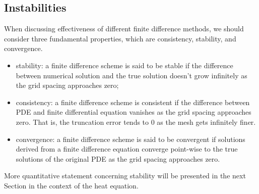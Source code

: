 
\subsection{Instabilities}
When discussing effectiveness of different finite difference methods, we should consider three fundamental properties, which are consistency, stability, and convergence. %

\begin{itemize}
\item stability: a finite difference scheme is said to be stable if the difference between numerical solution and the true solution doesn't grow infinitely as the grid spacing approaches zero; %
\item consistency: a finite difference scheme is consistent if the difference between PDE and finite differential equation vanishes as the grid spacing approaches zero. That is, the truncation error tends to 0 as the mesh gets infinitely finer.
\item convergence: a finite difference scheme is said to be convergent if solutions derived from a finite difference equation converge point-wise to the true solutions of the original PDE as the grid spacing approaches zero.
\end{itemize}

More quantitative statement concerning stability will be presented in the next Section in the context of the heat equation.

